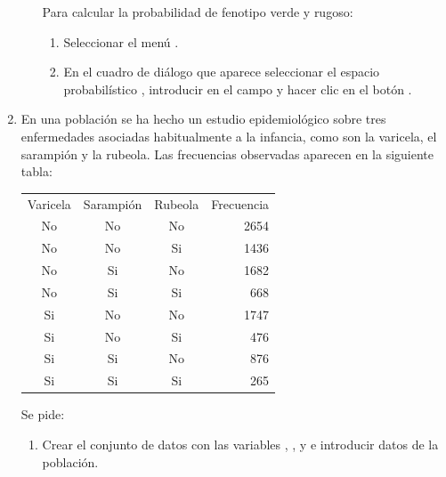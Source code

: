 \begin{enumerate}[leftmargin=*]
\begin{enumerate}
\begin{indicacion}
\begin{enumerate}
\end{enumerate}
Para calcular la probabilidad de fenotipo verde y rugoso:
\begin{enumerate}
\item Seleccionar el menú .
\item En el cuadro de diálogo que aparece seleccionar el espacio probabilístico , introducir
 en el campo  y hacer clic en el botón .
\end{enumerate}
\end{indicacion}
\end{enumerate}


\item En una población se ha hecho un estudio epidemiológico sobre tres enfermedades asociadas habitualmente a la infancia, como son la
varicela, el sarampión y la rubeola.
Las frecuencias observadas aparecen en la siguiente tabla:
\begin{center} 
\begin{tabular}{cccr}
\hline
Varicela & Sarampión & Rubeola & Frecuencia\\
No & No & No & 2654\\
No & No & Si & 1436\\
No & Si & No & 1682\\
No & Si & Si & 668\\
Si & No & No & 1747\\
Si & No & Si & 476\\
Si & Si & No & 876\\
Si & Si & Si & 265\\
\hline
\end{tabular}
\end{center}

Se pide:
\begin{enumerate}
\item Crear el conjunto de datos  con las variables , ,
 y  e introducir datos de la población.


\end{enumerate}
\end{enumerate}
